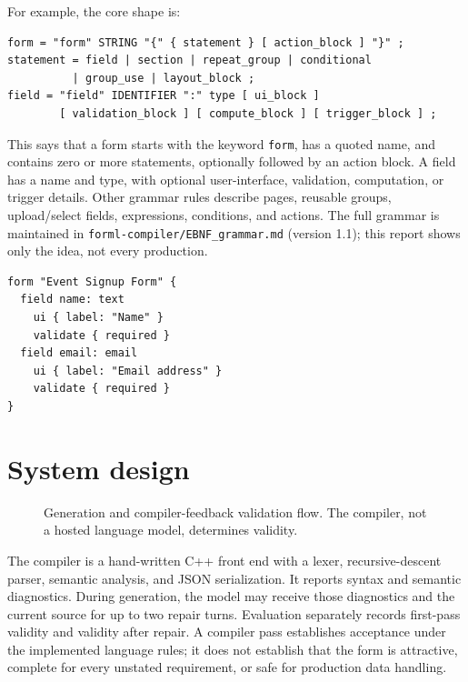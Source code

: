 \documentclass[11pt,a4paper]{article}
\begin{document}
\noindent\begin{minipage}{\linewidth}
For example, the core shape is:
\begin{lstlisting}[style=forml]
form = "form" STRING "{" { statement } [ action_block ] "}" ;
statement = field | section | repeat_group | conditional
          | group_use | layout_block ;
field = "field" IDENTIFIER ":" type [ ui_block ]
        [ validation_block ] [ compute_block ] [ trigger_block ] ;
\end{lstlisting}
\end{minipage}

This says that a form starts with the keyword \texttt{form}, has a quoted name, and contains zero or more statements, optionally followed by an action block. A field has a name and type, with optional user-interface, validation, computation, or trigger details. Other grammar rules describe pages, reusable groups, upload/select fields, expressions, conditions, and actions. The full grammar is maintained in \texttt{forml-compiler/EBNF\_grammar.md} (version 1.1); this report shows only the idea, not every production.

\begin{lstlisting}[style=forml,caption={Illustrative Forml output from the local demonstration.}]
form "Event Signup Form" {
  field name: text
    ui { label: "Name" }
    validate { required }
  field email: email
    ui { label: "Email address" }
    validate { required }
}
\end{lstlisting}

\section{System design}
\begin{figure}[H]
\centering
{}
\caption{Generation and compiler-feedback validation flow. The compiler, not a hosted language model, determines validity.}
\end{figure}

The compiler is a hand-written C++ front end with a lexer, recursive-descent parser, semantic analysis, and JSON serialization. It reports syntax and semantic diagnostics. During generation, the model may receive those diagnostics and the current source for up to two repair turns. Evaluation separately records first-pass validity and validity after repair. A compiler pass establishes acceptance under the implemented language rules; it does not establish that the form is attractive, complete for every unstated requirement, or safe for production data handling.
\end{document}
